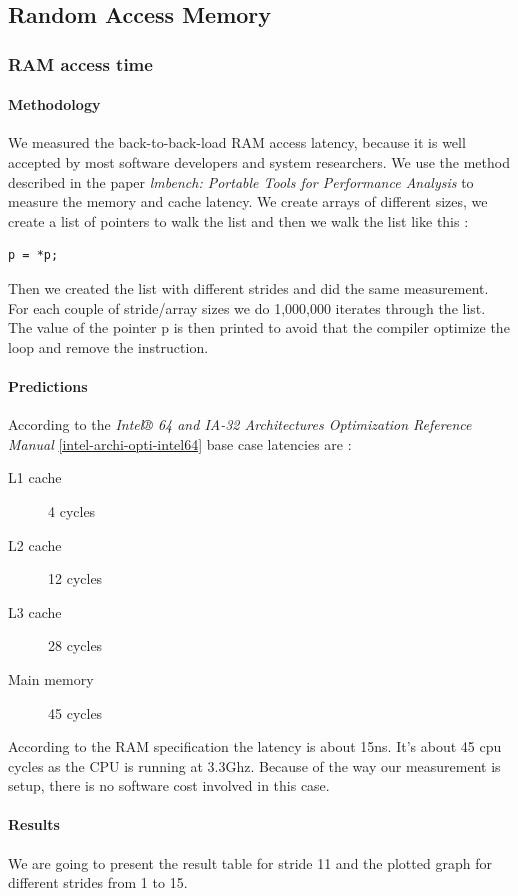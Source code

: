 \subsection{Random Access Memory}

\subsubsection{RAM access time}
\paragraph{Methodology}
We measured the back-to-back-load RAM access latency, because it is well accepted by most software developers and system researchers.
We use the method described in the paper \emph{lmbench: Portable Tools for Performance Analysis} to measure the memory and cache latency.
We create arrays of different sizes, we create a list of pointers to walk the list and then we walk the list like this :
\begin{verbatim}
p = *p;
\end{verbatim}

Then we created the list with different strides and did the same measurement.
For each couple of stride/array sizes we do 1,000,000 iterates through the list.
The value of the pointer p is then printed to avoid that the compiler optimize the loop and remove the instruction.

\paragraph{Predictions}
According to the \emph{Intel® 64 and IA-32 Architectures Optimization Reference Manual}
\ref{intel-archi-opti-intel64} base case latencies are :
\begin{description}
\item[L1 cache] 4 cycles
\item[L2 cache] 12 cycles
\item[L3 cache] 28 cycles
\item[Main memory] 45 cycles
\end{description}
According to the RAM specification the latency is about 15ns.
It's about 45 cpu cycles as the CPU is running at 3.3Ghz. Because of the way our measurement is setup, there is no software cost involved in this case.


\paragraph{Results}
We are going to present the result table for stride 11 and the plotted graph for different strides from 1 to 15.

